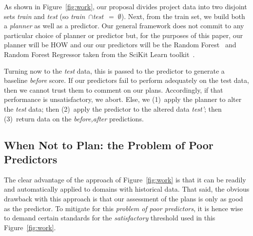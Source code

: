 \documentclass[conference]{IEEEtran}
\newcommand{\fig}[1]{Figure~\ref{fig:#1}}
\begin{document}
As shown in \fig{work}, our proposal divides
project data  into two disjoint sets {\em train} and {\em test}
(so \mbox{{\em train} $\cap ${\em test} $=\;\emptyset$}).
Next, from the train set, we build both a {\em planner} as well
as a {  predictor}. Our general framework does not   commit to any particular  choice
of { planner} or { predictor} but, for the purposes of this paper, 
our { planner}
will be HOW  and our
our { predictors} will be the Random Forest~\cite{Breiman2001} and Random Forest
Regressor taken from the SciKit
Learn toolkit~\cite{Pedregosa2012}.  
%
%


Turning now to the {\em test} data, this is passed to the { predictor}
to generate a baseline {\em before}  score.
If our { predictors} fail to perform adequately on the test data,
then we cannot trust them to comment on our plans. Accordingly,
if that performance is unsatisfactory, we abort.
Else, we (1)~apply the { planner} to alter the {\em test} data;
then (2)~apply the { predictor} to the altered data {\em test'};
then (3)~return data on the {\em before,after} predictions.



\subsection{When Not to Plan: the Problem of Poor Predictors}\label{sec:notplan}

The clear advantage of the approach of \fig{work} is that it can be readily and automatically
applied to domains with historical data. That said, the obvious drawback with this approach
is that our assessment of the plans is only as good as the predictor. To 
mitigate for this {\em problem of poor predictors}, it is hence wise to demand certain standards for the {\em
satisfactory} threshold used in this \fig{work}. 
 
\end{document}
